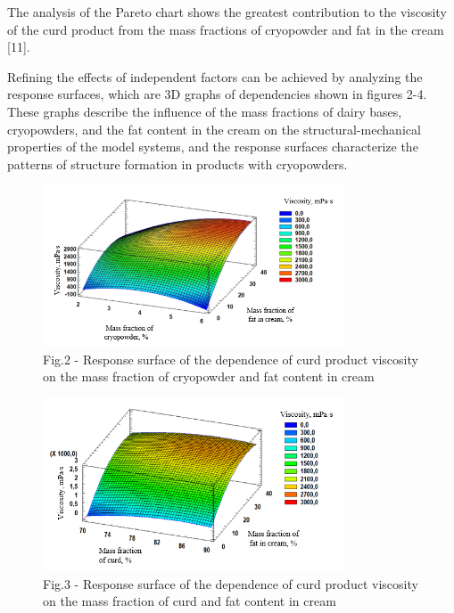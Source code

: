 \begin{multicols}{2}
The analysis of the Pareto chart shows the greatest contribution to the
viscosity of the curd product from the mass fractions of cryopowder and
fat in the cream {[}11{]}.

Refining the effects of independent factors can be achieved by analyzing
the response surfaces, which are 3D graphs of dependencies shown in
figures 2-4. These graphs describe the influence of the mass fractions
of dairy bases, cryopowders, and the fat content in the cream on the
structural-mechanical properties of the model systems, and the response
surfaces characterize the patterns of structure formation in products
with cryopowders.
\end{multicols}

\begin{figure}[H]
	\centering
	\includegraphics[width=0.8\textwidth]{media/pish2/image82}
	\caption*{Fig.2 - Response surface of the dependence of curd product viscosity on the mass fraction of cryopowder and fat content in cream}
\end{figure}

\begin{figure}[H]
	\centering
	\includegraphics[width=0.8\textwidth]{media/pish2/image83}
	\caption*{Fig.3 - Response surface of the dependence of curd product
viscosity on the mass fraction of curd and fat content in cream}
\end{figure}

